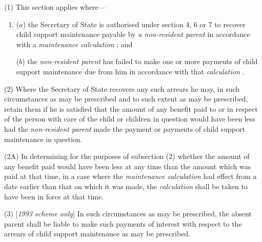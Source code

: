 \documentclass[12pt,a4paper]{article}
\begin{document}
(1) This section applies where—
\begin{enumerate}\item[]
($a$) the Secretary of State is authorised under section 4, 6 or 7 to recover child support maintenance payable by 
\emph{a non-resident parent}  %
in accordance with a 
\emph{maintenance calculation}%
; and

($b$) the 
\emph{non-resident parent}  %
has failed to make one or more payments of child support maintenance due from him in accordance with that 
\emph{calculation}%
.
\end{enumerate}


(2) Where the Secretary of State recovers any such arrears he may, in such circumstances as may be prescribed and to such extent as may be prescribed, retain them if he is satisfied that the amount of any benefit paid to or in respect of the person with care of the child or children in question would have been less had the 
\emph{non-resident parent}  %
made the payment or payments of child support maintenance in question.

(2A) In determining for the purposes of subsection (2) whether the amount of any benefit paid would have been less at any time than the amount which was paid at that time, in a case where the 
\emph{maintenance calculation}  %
had effect from a date earlier than that on which it was made, the 
\emph{calculation}  %
shall be taken to have been in force at that time.

(3) [\emph{1993 scheme only}] In such circumstances as may be prescribed, the absent parent shall be liable to make such payments of interest with respect to the arrears of child support maintenance as may be prescribed.
\end{document}
